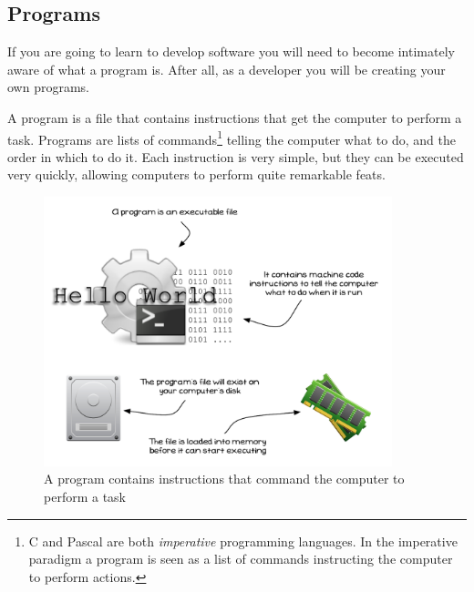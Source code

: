 \clearpage
\subsection{Programs} %
\label{sub:what_is_a_program_}

If you are going to learn to develop software you will need to become intimately aware of what a program is. After all, as a developer you will be creating your own programs.

A program is a file that contains instructions that get the computer to perform a task. Programs are lists of commands\footnote{C and Pascal are both \emph{imperative} programming languages. In the imperative paradigm a program is seen as a list of commands instructing the computer to perform actions.} telling the computer what to do, and the order in which to do it. Each instruction is very simple, but they can be executed very quickly, allowing computers to perform quite remarkable feats.

\begin{figure}[h]
   \centering
   \includegraphics[width=0.9\textwidth]{./topics/programs-and-compilers/diagrams/Program} 
   \caption{A program contains instructions that command the computer to perform a task}
   \label{fig:what-is-a-program}
\end{figure}

